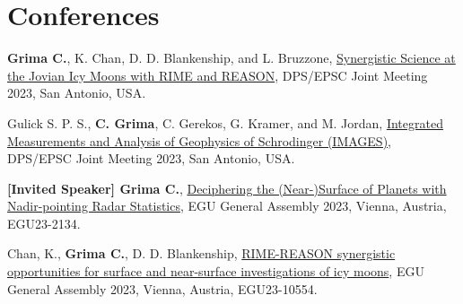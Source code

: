 \section*{Conferences}



\begin{etaremune}
\def\labelenumi{\arabic{enumi}.}





\item
 \textbf{Grima C.}, K. Chan, D. D. Blankenship, and L. Bruzzone, \href{https://submissions.mirasmart.com/DPS55/Itinerary/PresentationDetail.aspx?evdid=804}{Synergistic Science at the Jovian Icy Moons with RIME and REASON}, DPS/EPSC Joint Meeting 2023, San Antonio, USA.

\item
    Gulick S. P. S., \textbf{C. Grima}, C. Gerekos, G. Kramer, and M. Jordan, \href{https://submissions.mirasmart.com/DPS55/Itinerary/PresentationDetail.aspx?evdid=992}{Integrated Measurements and Analysis of Geophysics of Schrodinger (IMAGES)}, DPS/EPSC Joint Meeting 2023, San Antonio, USA.

\item
    \textbf{[Invited Speaker] Grima C.}, \href{https://meetingorganizer.copernicus.org/EGU23/EGU23-2134.html}{Deciphering the (Near-)Surface of Planets with Nadir-pointing Radar Statistics}, EGU General Assembly 2023, Vienna, Austria, EGU23-2134.

\item
    Chan, K., \textbf{Grima C.}, D. D. Blankenship, \href{https://meetingorganizer.copernicus.org/EGU23/EGU23-10554.html}{RIME-REASON synergistic opportunities for surface and near-surface investigations of icy moons}, EGU General Assembly 2023, Vienna, Austria, EGU23-10554.


\end{etaremune}
